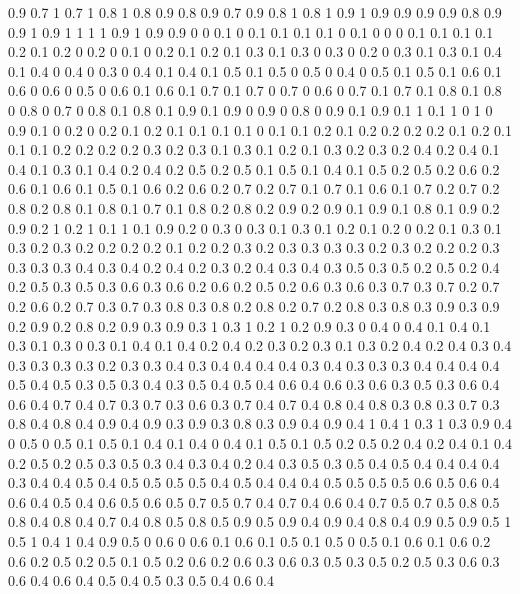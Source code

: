 0.9 0.7
1 0.7
1 0.8
1 0.8
0.9 0.8
0.9 0.7
0.9 0.8
1 0.8
1 0.9
1 0.9
0.9 0.9
0.9 0.8
0.9 0.9
1 0.9
1 1
1 1
0.9 1
0.9 0.9
0 0
0.1 0
0.1 0.1
0.1 0.1
0 0.1
0 0
0 0.1
0.1 0.1
0.1 0.2
0.1 0.2
0 0.2
0 0.1
0 0.2
0.1 0.2
0.1 0.3
0.1 0.3
0 0.3
0 0.2
0 0.3
0.1 0.3
0.1 0.4
0.1 0.4
0 0.4
0 0.3
0 0.4
0.1 0.4
0.1 0.5
0.1 0.5
0 0.5
0 0.4
0 0.5
0.1 0.5
0.1 0.6
0.1 0.6
0 0.6
0 0.5
0 0.6
0.1 0.6
0.1 0.7
0.1 0.7
0 0.7
0 0.6
0 0.7
0.1 0.7
0.1 0.8
0.1 0.8
0 0.8
0 0.7
0 0.8
0.1 0.8
0.1 0.9
0.1 0.9
0 0.9
0 0.8
0 0.9
0.1 0.9
0.1 1
0.1 1
0 1
0 0.9
0.1 0
0.2 0
0.2 0.1
0.2 0.1
0.1 0.1
0.1 0
0.1 0.1
0.2 0.1
0.2 0.2
0.2 0.2
0.1 0.2
0.1 0.1
0.1 0.2
0.2 0.2
0.2 0.3
0.2 0.3
0.1 0.3
0.1 0.2
0.1 0.3
0.2 0.3
0.2 0.4
0.2 0.4
0.1 0.4
0.1 0.3
0.1 0.4
0.2 0.4
0.2 0.5
0.2 0.5
0.1 0.5
0.1 0.4
0.1 0.5
0.2 0.5
0.2 0.6
0.2 0.6
0.1 0.6
0.1 0.5
0.1 0.6
0.2 0.6
0.2 0.7
0.2 0.7
0.1 0.7
0.1 0.6
0.1 0.7
0.2 0.7
0.2 0.8
0.2 0.8
0.1 0.8
0.1 0.7
0.1 0.8
0.2 0.8
0.2 0.9
0.2 0.9
0.1 0.9
0.1 0.8
0.1 0.9
0.2 0.9
0.2 1
0.2 1
0.1 1
0.1 0.9
0.2 0
0.3 0
0.3 0.1
0.3 0.1
0.2 0.1
0.2 0
0.2 0.1
0.3 0.1
0.3 0.2
0.3 0.2
0.2 0.2
0.2 0.1
0.2 0.2
0.3 0.2
0.3 0.3
0.3 0.3
0.2 0.3
0.2 0.2
0.2 0.3
0.3 0.3
0.3 0.4
0.3 0.4
0.2 0.4
0.2 0.3
0.2 0.4
0.3 0.4
0.3 0.5
0.3 0.5
0.2 0.5
0.2 0.4
0.2 0.5
0.3 0.5
0.3 0.6
0.3 0.6
0.2 0.6
0.2 0.5
0.2 0.6
0.3 0.6
0.3 0.7
0.3 0.7
0.2 0.7
0.2 0.6
0.2 0.7
0.3 0.7
0.3 0.8
0.3 0.8
0.2 0.8
0.2 0.7
0.2 0.8
0.3 0.8
0.3 0.9
0.3 0.9
0.2 0.9
0.2 0.8
0.2 0.9
0.3 0.9
0.3 1
0.3 1
0.2 1
0.2 0.9
0.3 0
0.4 0
0.4 0.1
0.4 0.1
0.3 0.1
0.3 0
0.3 0.1
0.4 0.1
0.4 0.2
0.4 0.2
0.3 0.2
0.3 0.1
0.3 0.2
0.4 0.2
0.4 0.3
0.4 0.3
0.3 0.3
0.3 0.2
0.3 0.3
0.4 0.3
0.4 0.4
0.4 0.4
0.3 0.4
0.3 0.3
0.3 0.4
0.4 0.4
0.4 0.5
0.4 0.5
0.3 0.5
0.3 0.4
0.3 0.5
0.4 0.5
0.4 0.6
0.4 0.6
0.3 0.6
0.3 0.5
0.3 0.6
0.4 0.6
0.4 0.7
0.4 0.7
0.3 0.7
0.3 0.6
0.3 0.7
0.4 0.7
0.4 0.8
0.4 0.8
0.3 0.8
0.3 0.7
0.3 0.8
0.4 0.8
0.4 0.9
0.4 0.9
0.3 0.9
0.3 0.8
0.3 0.9
0.4 0.9
0.4 1
0.4 1
0.3 1
0.3 0.9
0.4 0
0.5 0
0.5 0.1
0.5 0.1
0.4 0.1
0.4 0
0.4 0.1
0.5 0.1
0.5 0.2
0.5 0.2
0.4 0.2
0.4 0.1
0.4 0.2
0.5 0.2
0.5 0.3
0.5 0.3
0.4 0.3
0.4 0.2
0.4 0.3
0.5 0.3
0.5 0.4
0.5 0.4
0.4 0.4
0.4 0.3
0.4 0.4
0.5 0.4
0.5 0.5
0.5 0.5
0.4 0.5
0.4 0.4
0.4 0.5
0.5 0.5
0.5 0.6
0.5 0.6
0.4 0.6
0.4 0.5
0.4 0.6
0.5 0.6
0.5 0.7
0.5 0.7
0.4 0.7
0.4 0.6
0.4 0.7
0.5 0.7
0.5 0.8
0.5 0.8
0.4 0.8
0.4 0.7
0.4 0.8
0.5 0.8
0.5 0.9
0.5 0.9
0.4 0.9
0.4 0.8
0.4 0.9
0.5 0.9
0.5 1
0.5 1
0.4 1
0.4 0.9
0.5 0
0.6 0
0.6 0.1
0.6 0.1
0.5 0.1
0.5 0
0.5 0.1
0.6 0.1
0.6 0.2
0.6 0.2
0.5 0.2
0.5 0.1
0.5 0.2
0.6 0.2
0.6 0.3
0.6 0.3
0.5 0.3
0.5 0.2
0.5 0.3
0.6 0.3
0.6 0.4
0.6 0.4
0.5 0.4
0.5 0.3
0.5 0.4
0.6 0.4
